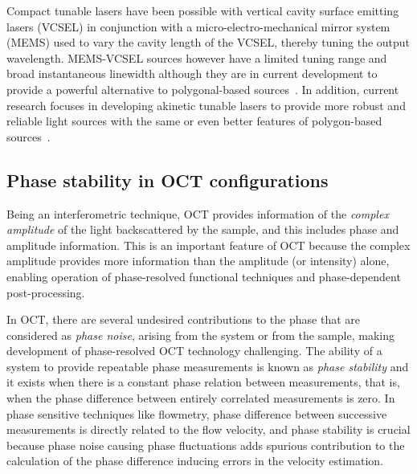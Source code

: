 Compact tunable lasers have been possible with vertical cavity surface emitting lasers (VCSEL) in conjunction with a micro-electro-mechanical mirror system (MEMS) used to vary the cavity length of the VCSEL, thereby tuning the output wavelength. MEMS-VCSEL sources however have a limited tuning range and broad instantaneous linewidth although they are in current development to provide a powerful alternative to polygonal-based sources~\cite{}. In addition, current research focuses in developing akinetic tunable lasers to provide more robust and reliable light sources with the same or even better features of polygon-based sources~\cite{}.

\subsection{Phase stability in OCT configurations}\label{sec:OCTConfigPhaseStab}

Being an interferometric technique, OCT provides information of the \textit{complex amplitude} of the light backscattered by the sample, and this includes phase and amplitude information. This is an important feature of OCT because the complex amplitude provides more information than the amplitude (or intensity) alone, enabling operation of phase-resolved functional techniques and phase-dependent post-processing.

In OCT, there are several undesired contributions to the phase that are considered as \textit{phase noise}, arising from the system or from the sample, making development of phase-resolved OCT technology challenging. The ability of a system to provide repeatable phase measurements is known as \textit{phase stability} and it exists when there is a constant phase relation between measurements, that is, when the phase difference between entirely correlated measurements is zero. In phase sensitive techniques like flowmetry, phase difference between successive measurements is directly related to the flow velocity, and phase stability is crucial because phase noise causing phase fluctuations adds spurious contribution to the calculation of the phase difference inducing errors in the velocity estimation.

